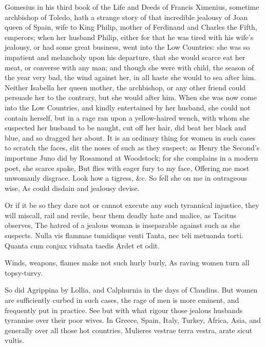 {Gomesius in his third book of the Life and Deeds of Francis Ximenius,
sometime archbishop of Toledo, hath a strange story of that incredible
jealousy of Joan queen of Spain, wife to King Philip, mother of
Ferdinand and Charles the Fifth, emperors; when her husband Philip,
either for that he was tired with his wife's jealousy, or had some
great business, went into the Low Countries: she was so impatient and
melancholy upon his departure, that she would scarce eat her meat, or
converse with any man; and though she were with child, the season of
the year very bad, the wind against her, in all haste she would to sea
after him. Neither Isabella her queen mother, the archbishop, or any
other friend could persuade her to the contrary, but she would after
him. When she was now come into the Low Countries, and kindly
entertained by her husband, she could not contain herself, but in
a rage ran upon a yellow-haired wench, with whom she suspected her
husband to be naught, cut off her hair, did beat her black and blue,
and so dragged her about. It is an ordinary thing for women in such
cases to scratch the faces, slit the noses of such as they suspect; as
Henry the Second's importune Juno did by Rosamond at Woodstock; for she
complains in a modern poet, she scarce spake,
But flies with eager fury to my face,
Offering me most unwomanly disgrace.
Look how a tigress, \&c.
So fell she on me in outrageous wise,
As could disdain and jealousy devise.

Or if it be so they dare not or cannot execute any such tyrannical
injustice, they will miscall, rail and revile, bear them deadly hate
and malice, as Tacitus observes, The hatred of a jealous woman is
inseparable against such as she suspects.
Nulla vis flammae tumidique venti
Tanta, nec teli metuanda torti.
Quanta cum conjux viduata taedis
Ardet et odit.

Winds, weapons, flames make not such hurly burly,
As raving women turn all topsy-turvy.

So did Agrippina by Lollia, and Calphurnia in the days of Claudius. But
women are sufficiently curbed in such cases, the rage of men is more
eminent, and frequently put in practice. See but with what rigour those
jealous husbands tyrannise over their poor wives. In Greece, Spain,
Italy, Turkey, Africa, Asia, and generally over all those hot
countries,  Mulieres vestrae terra vestra, arate sicut vultis.

}
